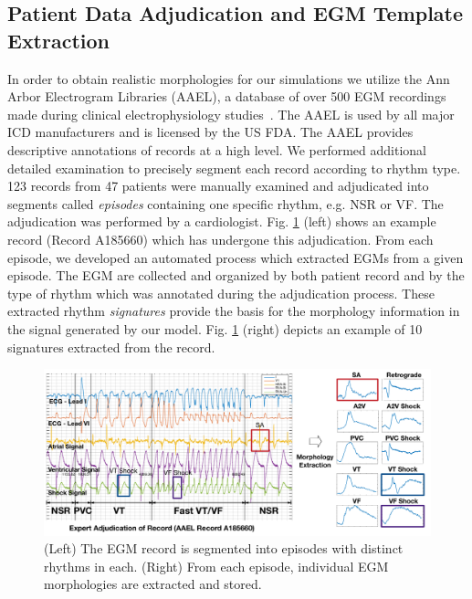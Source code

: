 \subsection{Patient Data Adjudication and EGM Template Extraction}
In order to obtain realistic morphologies for our simulations we utilize the Ann Arbor Electrogram Libraries (AAEL), a database of over 500 EGM recordings made during clinical electrophysiology studies~\cite{AAEL}. 
The AAEL is used by all major ICD manufacturers and is licensed by the US FDA. 
The AAEL provides descriptive annotations of records at a high level.
We performed additional detailed examination to precisely segment each record according to rhythm type.
123 records from 47 patients were manually examined and adjudicated into segments called \emph{episodes} containing one specific rhythm, e.g. NSR or VF. 
The adjudication was performed by a cardiologist.
Fig. \ref{fig:adjudication} (left) shows an example record (Record A185660) which has undergone this adjudication.
From each episode, we developed an automated process which extracted EGMs from a given episode. 
The EGM are collected and organized by both patient record and by the type of rhythm which was annotated during the adjudication process.
These extracted rhythm \emph{signatures} provide the basis for the morphology information in the signal generated by our model.
Fig. \ref{fig:adjudication} (right) depicts an example of 10 signatures extracted from the record. 

\begin{figure}[t]
	\centering
	\includegraphics[scale=0.35]{figures/figadjudication.pdf}
	\caption{\small  (Left) The EGM record is segmented into episodes with distinct rhythms in each. (Right) From each episode, individual EGM morphologies are extracted and stored.
	}
	\label{fig:adjudication}
\end{figure}

